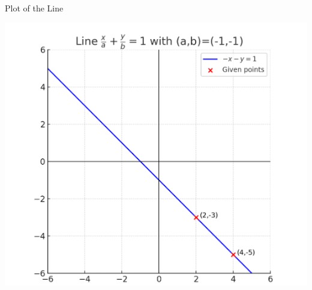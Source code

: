 \documentclass{beamer}
\begin{document}
\begin{frame}{Plot of the Line}
\begin{center}
\includegraphics[width=0.7\columnwidth]{figs/plot6.png}
\end{center}
\end{frame}
\end{document}
